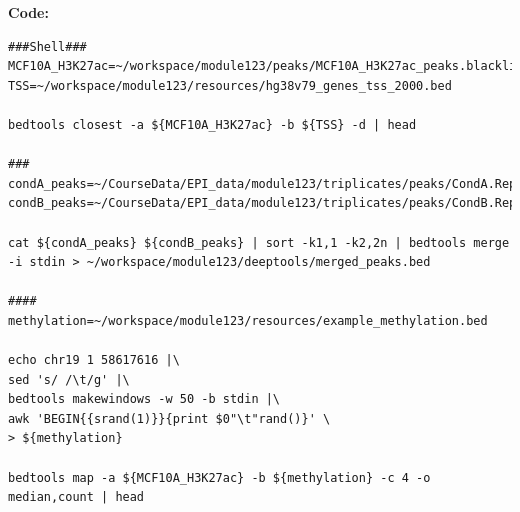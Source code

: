\documentclass[
]{book}
\begin{document}
\textbf{Code:}

\begin{verbatim}
###Shell###
MCF10A_H3K27ac=~/workspace/module123/peaks/MCF10A_H3K27ac_peaks.blacklistRemoved.narrowPeak
TSS=~/workspace/module123/resources/hg38v79_genes_tss_2000.bed

bedtools closest -a ${MCF10A_H3K27ac} -b ${TSS} -d | head

###
condA_peaks=~/CourseData/EPI_data/module123/triplicates/peaks/CondA.Rep1_peaks.narrowPeak
condB_peaks=~/CourseData/EPI_data/module123/triplicates/peaks/CondB.Rep1_peaks.narrowPeak

cat ${condA_peaks} ${condB_peaks} | sort -k1,1 -k2,2n | bedtools merge -i stdin > ~/workspace/module123/deeptools/merged_peaks.bed

####
methylation=~/workspace/module123/resources/example_methylation.bed

echo chr19 1 58617616 |\
sed 's/ /\t/g' |\
bedtools makewindows -w 50 -b stdin |\
awk 'BEGIN{{srand(1)}}{print $0"\t"rand()}' \
> ${methylation}

bedtools map -a ${MCF10A_H3K27ac} -b ${methylation} -c 4 -o median,count | head
\end{verbatim}
\end{document}
